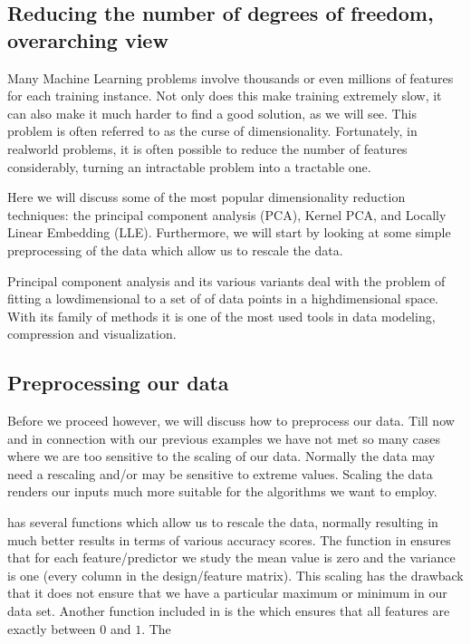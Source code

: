 \documentclass[letterpaper,10pt,english]{sphinxmanual}
\begin{document}
\subsection{Reducing the number of degrees of freedom, overarching view}
\label{\detokenize{chapter8:reducing-the-number-of-degrees-of-freedom-overarching-view}}
Many Machine Learning problems involve thousands or even millions of
features for each training instance. Not only does this make training
extremely slow, it can also make it much harder to find a good
solution, as we will see. This problem is often referred to as the
curse of dimensionality.  Fortunately, in real\sphinxhyphen{}world problems, it is
often possible to reduce the number of features considerably, turning
an intractable problem into a tractable one.

Here we will discuss some of the most popular dimensionality reduction
techniques: the principal component analysis (PCA), Kernel PCA, and
Locally Linear Embedding (LLE).  Furthermore, we will start by looking
at some simple preprocessing of the data which allow us to rescale the
data.

Principal component analysis and its various variants deal with the
problem of fitting a low\sphinxhyphen{}dimensional  to a set of of
data points in a high\sphinxhyphen{}dimensional space. With its family of methods it
is one of the most used tools in data modeling, compression and
visualization.


\subsection{Preprocessing our data}
\label{\detokenize{chapter8:preprocessing-our-data}}
Before we proceed however, we will discuss how to preprocess our
data. Till now and in connection with our previous examples we have
not met so many cases where we are too sensitive to the scaling of our
data. Normally the data may need a rescaling and/or may be sensitive
to extreme values. Scaling the data renders our inputs much more
suitable for the algorithms we want to employ.

 has several functions which allow us to rescale the
data, normally resulting in much better results in terms of various
accuracy scores.  The  function in 
ensures that for each feature/predictor we study the mean value is
zero and the variance is one (every column in the design/feature
matrix).  This scaling has the drawback that it does not ensure that
we have a particular maximum or minimum in our data set. Another
function included in  is the  which
ensures that all features are exactly between \(0\) and \(1\). The
\end{document}
